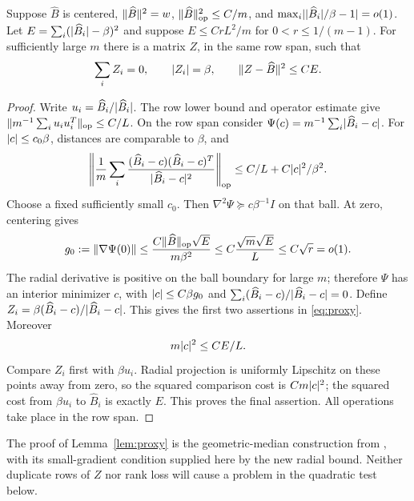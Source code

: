 \begin{lemma}\label{lem:proxy}
Suppose $\widehat B$ is centered, $\lVert \widehat B\rVert^2=w$,
$\lVert \widehat B\rVert_{\rm op}^2\le C/m$, and
$\max_i\lvert \lvert \widehat B_i\rvert/\beta-1\rvert=o(1)$.
Let $E=\sum_i(\lvert \widehat B_i\rvert-\beta)^2$ and suppose
$E\le CrL^2/m$ for $0<r\le1/(m-1)$. For sufficiently large $m$ there is a matrix $Z$,
in the same row span, such that
\begin{equation}\label{eq:proxy}
 \sum_i Z_i=0,\qquad \lvert Z_i\rvert=\beta,\qquad
                       \lVert Z-\widehat B\rVert^2\le CE.
\end{equation}
\end{lemma}
\begin{proof}
Write $u_i=\widehat B_i/\lvert \widehat B_i\rvert$. The row lower bound and
operator estimate give
$\lVert m^{-1}\sum_i u_iu_i^T\rVert_{\rm op}\le C/L$.
On the row span consider
$\Psi(c)=m^{-1}\sum_i\lvert \widehat B_i-c\rvert$.
For $\lvert c\rvert\le c_0\beta$, distances are comparable to $\beta$, and
\[
 \left\lVert\frac1m\sum_i
 \frac{(\widehat B_i-c)(\widehat B_i-c)^T}
                         {\lvert \widehat B_i-c\rvert^2}\right\rVert_{\rm op}
               \le C/L+C\lvert c\rvert^2/\beta^2.
\]
Choose a fixed sufficiently small $c_0$. Then
$\nabla^2\Psi\succeq c\beta^{-1}I$ on that ball.
At zero, centering gives
\[
 g_0:=\lVert \nabla\Psi(0)\rVert
 \le\frac{C\lVert \widehat B\rVert_{\rm op}\sqrt E}{m\beta^2}
 \le C\frac{\sqrt m\sqrt E}{L}\le C\sqrt r=o(1).
\]
The radial derivative is positive on the ball boundary for large $m$;
therefore $\Psi$ has an interior minimizer $c$, with
$\lvert c\rvert\le C\beta g_0$ and
$\sum_i(\widehat B_i-c)/\lvert \widehat B_i-c\rvert=0$.
Define $Z_i=\beta(\widehat B_i-c)/\lvert \widehat B_i-c\rvert$.
This gives the first two assertions in \eqref{eq:proxy}. Moreover
\[
 m\lvert c\rvert^2\le C E/L.
\]
Compare $Z_i$ first with $\beta u_i$. Radial projection is uniformly
Lipschitz on these points away from zero, so the squared comparison
cost is $Cm\lvert c\rvert^2$; the squared cost from $\beta u_i$ to
$\widehat B_i$ is exactly $E$. This proves the final assertion.
All operations take place in the row span.
\end{proof}

\begin{remark}
The proof of Lemma~\ref{lem:proxy} is the geometric-median construction
from \cite{rowcontrol}, with its small-gradient condition supplied here
by the new radial bound. Neither duplicate rows of $Z$ nor rank loss
will cause a problem in the quadratic test below.
\end{remark}
